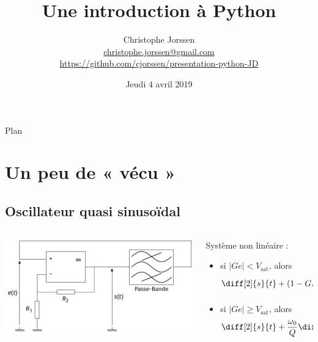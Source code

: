 \documentclass[10pt,aspectratio=169]{beamer}
\title{Une introduction à Python}
\institute[]{Lycée Jacques Decour -- Paris}
\author[C. Jorssen]{%
  Christophe Jorssen\\
  \footnotesize\href{mailto:christophe.jorssen@gmail.com}{christophe.jorssen@gmail.com} \\
  \footnotesize\url{https://github.com/cjorssen/presentation-python-JD}}
\date{Jeudi 4 avril 2019}
\begin{document}
\begin{frame}
  \titlepage
\end{frame}

\begin{frame}
\end{frame}

\begin{frame}{Plan}
  \tableofcontents[hideallsubsections]
\end{frame}

\section{Un peu de « vécu »}

\subsection{Oscillateur quasi sinusoïdal}

\begin{frame}
  \begin{columns}
    \begin{column}{.5\linewidth}
    \includegraphics[width = \linewidth]{schema-oscillateur-QS-boucle}
  \end{column}
  \begin{column}{.5\linewidth}
    Système non linéaire :
    \begin{itemize}
    \item si $|G e| < V_{\mathrm{sat}}$, alors $$\diff[2]{s}{t} + (1 - G H_0) \frac{\omega_0}{Q} \diff{s}{t} + \omega_0^2 s = 0 ;$$
    \item si $|G e| \geqslant V_{\mathrm{sat}}$, alors $$\diff[2]{s}{t} + \frac{\omega_0}{Q} \diff{s}{t} + \omega_0^2 s = 0.$$
    \end{itemize}

  \end{column}
\end{columns}
\end{frame}
\end{document}
